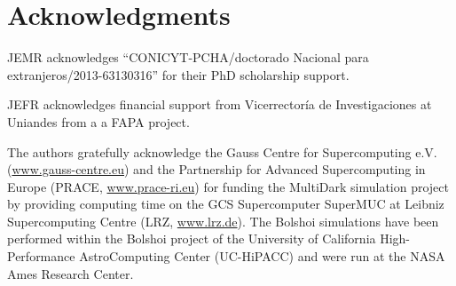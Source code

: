 \documentclass{emulateapj}
\begin{document}
\section*{Acknowledgments} 

JEMR acknowledges ``CONICYT-PCHA/doctorado Nacional para
extranjeros/2013-63130316'' for their PhD scholarship support.  

JEFR acknowledges financial support from Vicerrector\'ia de
Investigaciones at Uniandes from a a FAPA project.

The authors gratefully acknowledge the Gauss Centre for Supercomputing
e.V. (\url{www.gauss-centre.eu}) and the Partnership for Advanced
Supercomputing in Europe (PRACE, \url{www.prace-ri.eu}) for funding the
MultiDark simulation project by providing computing time on the GCS
Supercomputer SuperMUC at Leibniz Supercomputing Centre (LRZ,
\url{www.lrz.de}). The Bolshoi simulations have been performed within the
Bolshoi project of the University of California High-Performance
AstroComputing Center (UC-HiPACC) and were run at the NASA Ames
Research Center. 
\end{document}
